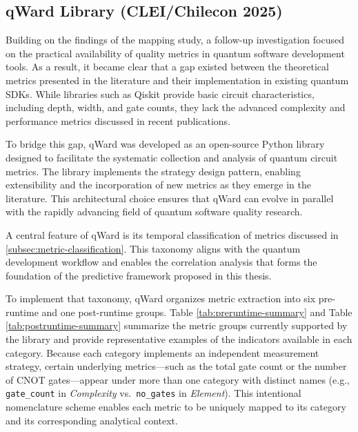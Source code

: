 \documentclass{article}
\begin{document}
\subsection{qWard Library (CLEI/Chilecon 2025)}
\label{subsection:qward}

Building on the findings of the mapping study, a follow-up investigation focused on the practical availability of quality metrics in quantum software development tools. As a result, it became clear that a gap existed between the theoretical metrics presented in the literature and their implementation in existing quantum SDKs. While libraries such as Qiskit provide basic circuit characteristics, including depth, width, and gate counts, they lack the advanced complexity and performance metrics discussed in recent publications.

To bridge this gap, qWard \cite{QiskitqwardFrameworkAnalyzing} was developed as an open-source Python library designed to facilitate the systematic collection and analysis of quantum circuit metrics. The library implements the strategy design pattern, enabling extensibility and the incorporation of new metrics as they emerge in the literature. This architectural choice ensures that qWard can evolve in parallel with the rapidly advancing field of quantum software quality research.

A central feature of qWard is its temporal classification of metrics discussed in \ref{subsec:metric-classification}. This taxonomy aligns with the quantum development workflow and enables the correlation analysis that forms the foundation of the predictive framework proposed in this thesis.

To implement that taxonomy, qWard organizes metric extraction into six pre-runtime and one post-runtime groups. Table \ref{tab:preruntime-summary} and Table \ref{tab:postruntime-summary} summarize the metric groups currently supported by the library and provide representative examples of the indicators available in each category. Because each category implements an independent measurement strategy, certain underlying metrics---such as the total gate count or the number of CNOT gates---appear under more than one category with distinct names (e.g., \texttt{gate\_count} in \emph{Complexity} vs.\ \texttt{no\_gates} in \emph{Element}). This intentional nomenclature scheme enables each metric to be uniquely mapped to its category and its corresponding analytical context.
\end{document}
